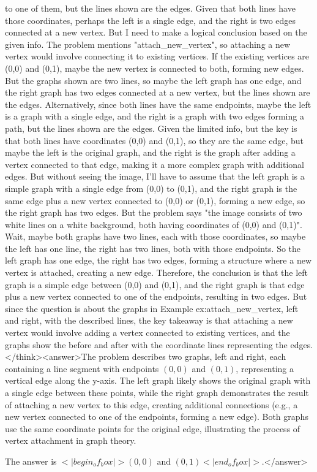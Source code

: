 to one of them, but the lines shown are the edges. Given that both lines have those coordinates, perhaps the left is a single edge, and the right is two edges connected at a new vertex. But I need to make a logical conclusion based on the given info. The problem mentions "attach_new_vertex", so attaching a new vertex would involve connecting it to existing vertices. If the existing vertices are (0,0) and (0,1), maybe the new vertex is connected to both, forming new edges. But the graphs shown are two lines, so maybe the left graph has one edge, and the right graph has two edges connected at a new vertex, but the lines shown are the edges. Alternatively, since both lines have the same endpoints, maybe the left is a graph with a single edge, and the right is a graph with two edges forming a path, but the lines shown are the edges. Given the limited info, but the key is that both lines have coordinates (0,0) and (0,1), so they are the same edge, but maybe the left is the original graph, and the right is the graph after adding a vertex connected to that edge, making it a more complex graph with additional edges. But without seeing the image, I'll have to assume that the left graph is a simple graph with a single edge from (0,0) to (0,1), and the right graph is the same edge plus a new vertex connected to (0,0) or (0,1), forming a new edge, so the right graph has two edges. But the problem says "the image consists of two white lines on a white background, both having coordinates of (0,0) and (0,1)". Wait, maybe both graphs have two lines, each with those coordinates, so maybe the left has one line, the right has two lines, both with those endpoints. So the left graph has one edge, the right has two edges, forming a structure where a new vertex is attached, creating a new edge. Therefore, the conclusion is that the left graph is a simple edge between (0,0) and (0,1), and the right graph is that edge plus a new vertex connected to one of the endpoints, resulting in two edges. But since the question is about the graphs in Example ex:attach_new_vertex, left and right, with the described lines, the key takeaway is that attaching a new vertex would involve adding a vertex connected to existing vertices, and the graphs show the before and after with the coordinate lines representing the edges.</think><answer>The problem describes two graphs, left and right, each containing a line segment with endpoints \((0,0)\) and \((0,1)\), representing a vertical edge along the y-axis. The left graph likely shows the original graph with a single edge between these points, while the right graph demonstrates the result of attaching a new vertex to this edge, creating additional connections (e.g., a new vertex connected to one of the endpoints, forming a new edge). Both graphs use the same coordinate points for the original edge, illustrating the process of vertex attachment in graph theory.  

The answer is \(<|begin_of_box|>(0,0) \text{ and } (0,1)<|end_of_box|>\).</answer>
